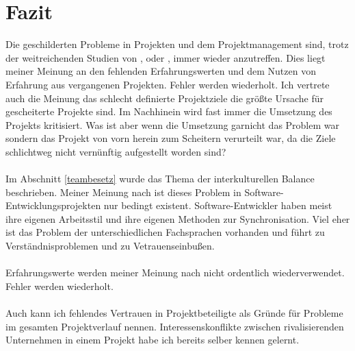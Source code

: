 \documentclass[11pt]{scrartcl}
\begin{document}
\section{Fazit}
Die geschilderten Probleme in Projekten und dem Projektmanagement sind, trotz der weitreichenden Studien von \cite{euregio__studie_erfolgsfaktoren}, \cite{gpm_gesamt_07_09} oder \cite{GPM_Studie_2008}, immer wieder anzutreffen. Dies liegt meiner Meinung an den fehlenden Erfahrungswerten und dem Nutzen von Erfahrung aus vergangenen Projekten. Fehler werden wiederholt. Ich vertrete auch die Meinung das schlecht definierte Projektziele die größte Ursache für gescheiterte Projekte sind. Im Nachhinein wird fast immer die Umsetzung des Projekts kritisiert. Was ist aber wenn die Umsetzung garnicht das Problem war sondern das Projekt von vorn herein zum Scheitern verurteilt war, da die Ziele schlichtweg nicht vernünftig aufgestellt worden sind?\\
\\
Im Abschnitt \ref{teambesetz} wurde das Thema der interkulturellen Balance beschrieben. Meiner Meinung nach ist dieses Problem in Software-Entwicklungsprojekten nur bedingt existent. Software-Entwickler haben meist ihre eigenen Arbeitsstil und ihre eigenen Methoden zur Synchronisation. Viel eher ist das Problem der unterschiedlichen Fachsprachen vorhanden und führt zu Verständnisproblemen und zu Vetrauenseinbußen.\\
\\
Erfahrungswerte werden meiner Meinung nach nicht ordentlich wiederverwendet. Fehler werden wiederholt.\\
\\
Auch kann ich fehlendes Vertrauen in Projektbeteiligte als Gründe für Probleme im gesamten Projektverlauf nennen. Interessenskonflikte zwischen rivalisierenden Unternehmen in einem Projekt habe ich bereits selber kennen gelernt.\\

\pagebreak
{} %

\appendix
\end{document}
